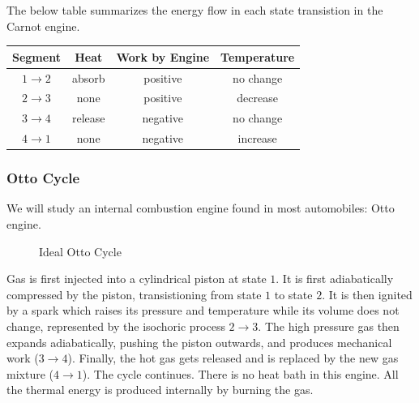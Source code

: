 The below table summarizes the energy flow in each state transistion in the Carnot engine.

\begin{center}
	\begin{tabular}{c|c|c|c}
		Segment & Heat & Work \textbf{by} Engine & Temperature \\
		\hline
		$1\to2$ & absorb & positive & no change \\
		\hline
		$2\to3$ & none & positive & decrease \\
		\hline
		$3\to4$ & release & negative & no change \\
		\hline
		$4\to1$ & none & negative & increase
	\end{tabular}
\end{center}

\subsubsection{Otto Cycle}

We will study an internal combustion engine found in most automobiles: Otto engine.

\begin{figure}[H]
	\centering
	\caption{Ideal Otto Cycle}
\end{figure}

Gas is first injected into a cylindrical piston at state $1$. It is first adiabatically compressed by the piston, transistioning from state $1$ to state $2$. It is then ignited by a spark which raises its pressure and temperature while its volume does not change, represented by the isochoric process $2\to3$. The high pressure gas then expands adiabatically, pushing the piston outwards, and produces mechanical work ($3\to4$). Finally, the hot gas gets released and is replaced by the new gas mixture ($4\to1$). The cycle continues. There is no heat bath in this engine. All the thermal energy is produced internally by burning the gas. \\

